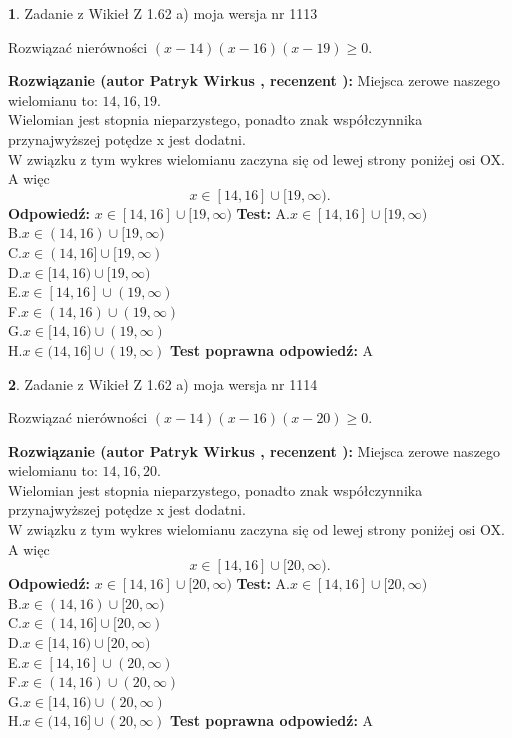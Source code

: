 \documentclass[12pt, a4paper]{article}
\theoremstyle{definition} %
\newtheorem{zad}{}
\newcommand{\zadStart}[1]{\begin{zad}#1\newline}
\newcommand{\zadStop}{\end{zad}}
\newcommand{\rozwStart}[2]{\noindent \textbf{Rozwiązanie (autor #1 , recenzent #2): }\newline}
\newcommand{\rozwStop}{\newline}
\newcommand{\odpStart}{\noindent \textbf{Odpowiedź:}\newline}
\newcommand{\odpStop}{\newline}
\newcommand{\testStart}{\noindent \textbf{Test:}\newline}
\newcommand{\testStop}{\newline}
\newcommand{\kluczStart}{\noindent \textbf{Test poprawna odpowiedź:}\newline}
\newcommand{\kluczStop}{\newline}
\begin{document}
\zadStart{Zadanie z Wikieł Z 1.62 a) moja wersja nr 1113}

Rozwiązać nierówności $(x-14)(x-16)(x-19)\ge0$.
\zadStop
\rozwStart{Patryk Wirkus}{}
Miejsca zerowe naszego wielomianu to: $14, 16, 19$.\\
Wielomian jest stopnia nieparzystego, ponadto znak współczynnika przy\linebreak najwyższej potędze x jest dodatni.\\ W związku z tym wykres wielomianu zaczyna się od lewej strony poniżej osi OX. A więc $$x \in [14,16] \cup [19,\infty).$$
\rozwStop
\odpStart
$x \in [14,16] \cup [19,\infty)$
\odpStop
\testStart
A.$x \in [14,16] \cup [19,\infty)$\\
B.$x \in (14,16) \cup [19,\infty)$\\
C.$x \in (14,16] \cup [19,\infty)$\\
D.$x \in [14,16) \cup [19,\infty)$\\
E.$x \in [14,16] \cup (19,\infty)$\\
F.$x \in (14,16) \cup (19,\infty)$\\
G.$x \in [14,16) \cup (19,\infty)$\\
H.$x \in (14,16] \cup (19,\infty)$
\testStop
\kluczStart
A
\kluczStop



\zadStart{Zadanie z Wikieł Z 1.62 a) moja wersja nr 1114}

Rozwiązać nierówności $(x-14)(x-16)(x-20)\ge0$.
\zadStop
\rozwStart{Patryk Wirkus}{}
Miejsca zerowe naszego wielomianu to: $14, 16, 20$.\\
Wielomian jest stopnia nieparzystego, ponadto znak współczynnika przy\linebreak najwyższej potędze x jest dodatni.\\ W związku z tym wykres wielomianu zaczyna się od lewej strony poniżej osi OX. A więc $$x \in [14,16] \cup [20,\infty).$$
\rozwStop
\odpStart
$x \in [14,16] \cup [20,\infty)$
\odpStop
\testStart
A.$x \in [14,16] \cup [20,\infty)$\\
B.$x \in (14,16) \cup [20,\infty)$\\
C.$x \in (14,16] \cup [20,\infty)$\\
D.$x \in [14,16) \cup [20,\infty)$\\
E.$x \in [14,16] \cup (20,\infty)$\\
F.$x \in (14,16) \cup (20,\infty)$\\
G.$x \in [14,16) \cup (20,\infty)$\\
H.$x \in (14,16] \cup (20,\infty)$
\testStop
\kluczStart
A
\kluczStop
\end{document}
